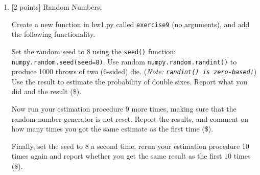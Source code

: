 \documentclass[10pt]{article}
\begin{document}
\begin{enumerate}
{\bf You must always document your code!}  Documenting your code is {\color{red} required} for this class -- you will loose points if you do not document your code.  Python in-line comments can be added using the \# character -- anything following will be ignored by python.  Python also uses a special idiom for documenting functions: Right after function signature line add documentation within a triple-quote body, e.g.,:
\begin{verbatim}
def scale01(arr):
    """
    Linearly scale the values of an array in the range [0,1]
    :param a: input ndarray
    :return: scaled ndarray
    """
    <function_body>...
\end{verbatim}
Beyond making your source code easier to understand and maintain, you also get the benefit of making documentation available within the python console, once functions are defined within the python instance.  For example, once I've executed the above function definition within the python console, I can execute {\tt help(scale01)} as follows:
\begin{verbatim}
>>> help(scale01)
Help on function scale01:

scale01(arr)
    Linearly scale the values of an array in the range [0,1]
    :param arr: input ndarray
    :return: scaled ndarray
\end{verbatim}

Document your code (with inline comments) and provide function docstrings for each function you write in this homework (\$).



\item \label{prob:9} [2 points]
Random Numbers:

Create a new function in hw1.py called {\tt exercise9} (no arguments), and add the following functionality.

Set the random seed to 8 using the {\tt seed()} function: {\tt numpy.random.seed(seed=8)}.  Use random {\tt numpy.random.randint()} to produce 1000 throws of two (6-sided) die.  ({\em Note: {\tt randint() is zero-based!}})  Use the result to estimate the probability of double sixes.  Report what you did and the result (\$).  

Now run your estimation procedure 9 more times, making sure that the random number generator is not reset.  Report the results, and comment on how many times you got the same estimate as the first time (\$).

Finally, set the seed to 8 a second time, rerun your estimation procedure 10 times again and report whether you get the same result as the first 10 times (\$).


\end{enumerate}
\end{document}
